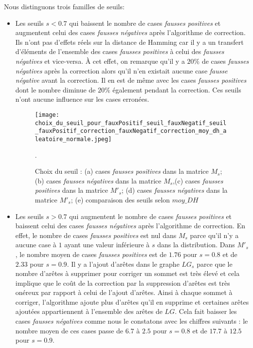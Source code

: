 Nous distinguons trois familles de seuils:
\begin{itemize}
	\item Les seuils $s < 0.7$ qui baissent le nombre de cases  {\em fausses positives} et augmentent celui des cases {\em fausses n\'egatives} apr\`es l'algorithme de correction. 
	Ils n'ont pas d'effets r\'eels sur la distance de Hamming car il y a un transfert d'\'el\'ements de l'ensemble des cases   {\em fausses positives} \`a celui des {\em fausses n\'egatives} et vice-versa. 
	\`A cet effet, on remarque  qu'il y a $20\%$ de cases {\em fausses n\'egatives} apr\`es la correction alors qu'il n'en existait aucune case {\em fausse n\'egative} avant la correction. 
	Il en est de m\^eme avec les cases  {\em fausses positives}  dont le nombre diminue de $20\%$  \'egalement pendant la correction. Ces seuils n'ont aucune influence sur les cases erron\'ees.
\begin{figure}[htb!] 
\centering
\texttt{[image: choix\_du\_seuil\_pour\_fauxPositif\_seuil\_fauxNegatif\_seuil\_fauxPositif\_correction\_fauxNegatif\_correction\_moy\_dh\_aleatoire\_normale.jpeg]}
\caption{ Choix du seuil : (a) cases {\em fausses positives} dans la matrice $M_s$; (b) cases {\em fausses n\'egatives} dans la matrice $M_s$,(c) cases {\em fausses positives} dans la matrice $M'_s$; (d) cases {\em fausses n\'egatives} dans la matrice $M'_s$; (e) comparaison des seuils selon $moy\_DH$ }.
\label{graphiquesFctCoutNormale} 
\end{figure}
\FloatBarrier

	\item Les seuils $s > 0.7$ qui augmentent le nombre de cases {\em fausses positives} et baissent celui des cases {\em fausses n\'egatives} apr\`es l'algorithme de correction. En effet, 
	le nombre de cases {\em fausses positives} est nul dans $M_s$ parce qu'il n'y a aucune case \`a $1$ ayant une valeur inf\'erieure \`a $s$ dans la distribution.
	Dans $M'_s$, le nombre moyen de cases {\em fausses positives} est de $1.76$ pour $s=0.8$ et de $2.33$ pour $s=0.9$. 
	Il y a l'ajout d'ar\^etes dans le graphe $LG_s$ parce que le nombre d'ar\^etes \`a supprimer pour corriger un sommet est tr\`es \'elev\'e et cela implique que le co\^ut de la correction par la suppression d'ar\^etes est tr\`es on\'ereux par rapport \`a celui de l'ajout d'ar\^etes. 
	Ainsi \`a chaque sommet \`a corriger, l'algorithme ajoute plus d'ar\^etes qu'il en supprime et certaines ar\^etes ajout\'ees appartiennent \`a l'ensemble des ar\^etes de $LG$.
	 Cela fait baisser les cases {\em fausses n\'egatives} comme nous le constatons avec les chiffres suivants : le nombre moyen de ces cases passe de  $6.7$ \`a $2.5$  pour $s = 0.8$ et de $17.7$ \`a $12.5$ pour $s = 0.9$.
	

\end{itemize}
